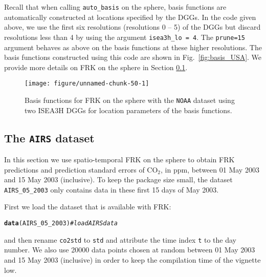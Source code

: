 \documentclass{article}\usepackage[]{graphicx}\usepackage[]{color}
\makeatletter
\newcommand{\hlcom}[1]{\textcolor[rgb]{0.678,0.584,0.686}{\textit{#1}}}%
\newcommand{\hlstd}[1]{\textcolor[rgb]{0.345,0.345,0.345}{#1}}%
\newcommand{\hlkwd}[1]{\textcolor[rgb]{0.737,0.353,0.396}{\textbf{#1}}}%
\newenvironment{kframe}{%
 \def\at@end@of@kframe{}%
 \ifinner\ifhmode%
  \def\at@end@of@kframe{\end{minipage}}%
  \begin{minipage}{\columnwidth}%
 \fi\fi%
 \def\FrameCommand##1{\hskip\@totalleftmargin \hskip-\fboxsep
 \colorbox{shadecolor}{##1}\hskip-\fboxsep
     \hskip-\linewidth \hskip-\@totalleftmargin \hskip\columnwidth}%
 \MakeFramed {\advance\hsize-\width
   \@totalleftmargin\z@ \linewidth\hsize
   \@setminipage}}%
 {\par\unskip\endMakeFramed%
 \at@end@of@kframe}
\newenvironment{knitrout}{}{} %
\renewcommand{\tt} {\texttt}
\newcommand{\pkg}[1]{{\fontseries{b}\selectfont #1}}
\makeatother
\begin{document}
Recall that when calling \tt{auto\_basis} on the sphere, basis functions are automatically constructed at locations specified by the DGGs. In the code given above, we use the first six resolutions (resolutions 0 -- 5) of the DGGs but discard resolutions less than 4 by using the argument \tt{isea3h\_lo = 4}. The \tt{prune=15} argument behaves as above on the basis functions at these higher resolutions. The basis functions constructed using this code are shown in Fig.~\ref{fig:basis_USA}. We provide more details on FRK on the sphere in Section \ref{sec:AIRS_ST}.

\begin{knitrout}
\color{fgcolor}\begin{figure}[t!]

{\centering \texttt{[image: figure/unnamed-chunk-50-1]} 

}

\caption{Basis functions for FRK on the sphere with the \tt{NOAA} dataset using two ISEA3H DGGs for location parameters of the basis functions.\label{fig:basis_USA}}\label{fig:unnamed-chunk-50}
\end{figure}


\end{knitrout}

\subsection{The \tt{AIRS} dataset} \label{sec:AIRS_ST}

In this section we use spatio-temporal FRK on the sphere to obtain FRK predictions and prediction standard errors of CO$_2$, in ppm, between 01 May 2003 and 15 May 2003 (inclusive). To keep the package size small, the dataset \tt{AIRS\_05\_2003} only contains data in these first 15 days of May 2003.

\vspace{0.1in}

 First we load the dataset that is available with \pkg{FRK}:

\begin{knitrout}
\color{fgcolor}\begin{kframe}
\begin{alltt}
\hlkwd{data}\hlstd{(AIRS_05_2003)}   \hlcom{# load AIRS data}
\end{alltt}
\end{kframe}
\end{knitrout}
\noindent and then rename \tt{co2std} to \tt{std} and attribute the time index \tt{t} to the day number. We also use 20000 data points chosen at random between 01 May 2003 and 15 May 2003 (inclusive) in order to keep the compilation time of the vignette low.
\end{document}
